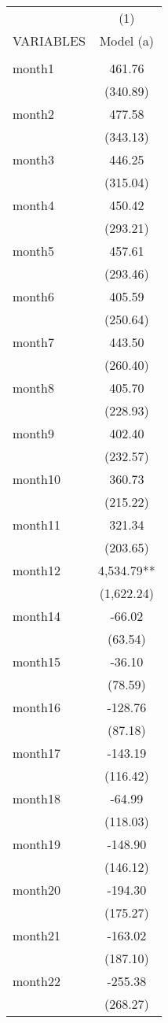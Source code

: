 \begin{tabular}{lc} \hline
 & (1) \\
VARIABLES & Model (a) \\ \hline
 &  \\
month1 & 461.76 \\
 & (340.89) \\
month2 & 477.58 \\
 & (343.13) \\
month3 & 446.25 \\
 & (315.04) \\
month4 & 450.42 \\
 & (293.21) \\
month5 & 457.61 \\
 & (293.46) \\
month6 & 405.59 \\
 & (250.64) \\
month7 & 443.50 \\
 & (260.40) \\
month8 & 405.70 \\
 & (228.93) \\
month9 & 402.40 \\
 & (232.57) \\
month10 & 360.73 \\
 & (215.22) \\
month11 & 321.34 \\
 & (203.65) \\
month12 & 4,534.79** \\
 & (1,622.24) \\
month14 & -66.02 \\
 & (63.54) \\
month15 & -36.10 \\
 & (78.59) \\
month16 & -128.76 \\
 & (87.18) \\
month17 & -143.19 \\
 & (116.42) \\
month18 & -64.99 \\
 & (118.03) \\
month19 & -148.90 \\
 & (146.12) \\
month20 & -194.30 \\
 & (175.27) \\
month21 & -163.02 \\
 & (187.10) \\
month22 & -255.38 \\
 & (268.27) \\

\end{tabular}
